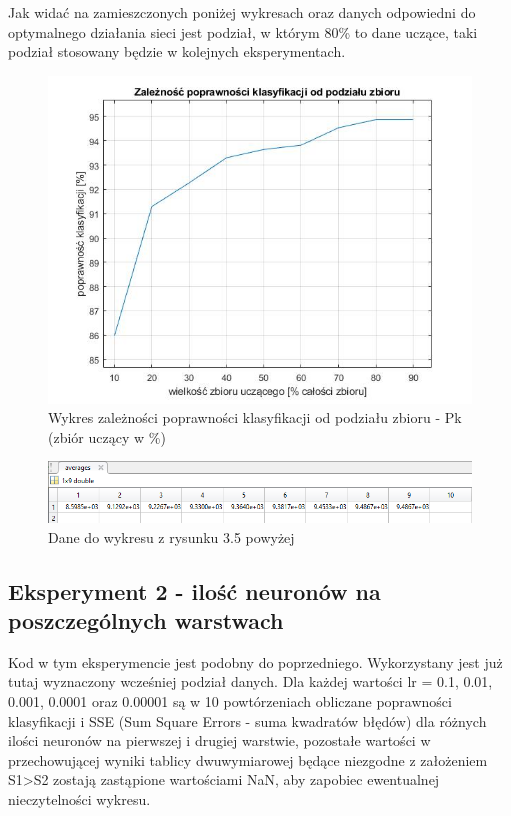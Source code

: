 \documentclass[a4paper, 12pt]{article}
\begin{document}
\newpage
Jak widać na zamieszczonych poniżej wykresach oraz danych odpowiedni do optymalnego działania sieci jest podział, w którym 80\% to dane uczące, taki podział stosowany będzie w kolejnych eksperymentach.

\begin{figure}[ht]
	\centering
	\includegraphics[width=12cm]{images/podzial1}
	\caption{Wykres zależności poprawności klasyfikacji od podziału zbioru - Pk (zbiór uczący w \%)}
\label{Fig:podzial1}
\end{figure}


\begin{figure}[ht]
	\centering
	\includegraphics[width=12cm]{images/podzial1 dane}
	\caption{Dane do wykresu z rysunku 3.5 powyżej}
\label{Fig:podzial1dane}
\end{figure}

\clearpage
\subsection{Eksperyment 2 - ilość neuronów na poszczególnych warstwach}
Kod w tym eksperymencie jest podobny do poprzedniego. Wykorzystany jest już tutaj wyznaczony wcześniej podział danych. Dla każdej wartości lr = 0.1, 0.01, 0.001, 0.0001 oraz 0.00001 są w 10 powtórzeniach obliczane poprawności klasyfikacji i SSE (Sum Square Errors - suma kwadratów błędów) dla różnych ilości neuronów na pierwszej  i drugiej warstwie, pozostałe wartości w przechowującej wyniki tablicy dwuwymiarowej będące niezgodne z założeniem S1>S2 zostają zastąpione wartościami NaN, aby zapobiec ewentualnej nieczytelności wykresu.
\end{document}
